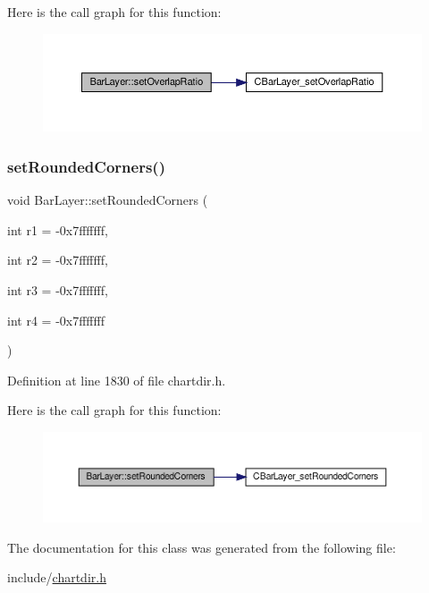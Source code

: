 Here is the call graph for this function\+:
\nopagebreak
\begin{figure}[H]
\begin{center}
\leavevmode
\includegraphics[width=350pt]{class_bar_layer_a422e4989ff347c49c30bc886ff87dbf4_cgraph}
\end{center}
\end{figure}
\mbox{\label{class_bar_layer_ad2a0baf6268a1494d1025eb137eebd3f}} 
\subsubsection{\texorpdfstring{set\+Rounded\+Corners()}{setRoundedCorners()}}
{\footnotesize\ttfamily void Bar\+Layer\+::set\+Rounded\+Corners (\begin{DoxyParamCaption}\item[{int}]{r1 = {\ttfamily -\/0x7fffffff},  }\item[{int}]{r2 = {\ttfamily -\/0x7fffffff},  }\item[{int}]{r3 = {\ttfamily -\/0x7fffffff},  }\item[{int}]{r4 = {\ttfamily -\/0x7fffffff} }\end{DoxyParamCaption})\hspace{0.3cm}{\ttfamily [inline]}}



Definition at line 1830 of file chartdir.\+h.

Here is the call graph for this function\+:
\nopagebreak
\begin{figure}[H]
\begin{center}
\leavevmode
\includegraphics[width=350pt]{class_bar_layer_ad2a0baf6268a1494d1025eb137eebd3f_cgraph}
\end{center}
\end{figure}


The documentation for this class was generated from the following file\+:\begin{DoxyCompactItemize}
\item 
include/\hyperlink{chartdir_8h}{chartdir.\+h}\end{DoxyCompactItemize}
